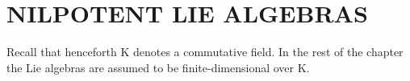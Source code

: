 \section{NILPOTENT LIE ALGEBRAS}

Recall that henceforth K denotes a commutative field. In the rest of the chapter the Lie algebras are assumed to be finite-dimensional over K.

